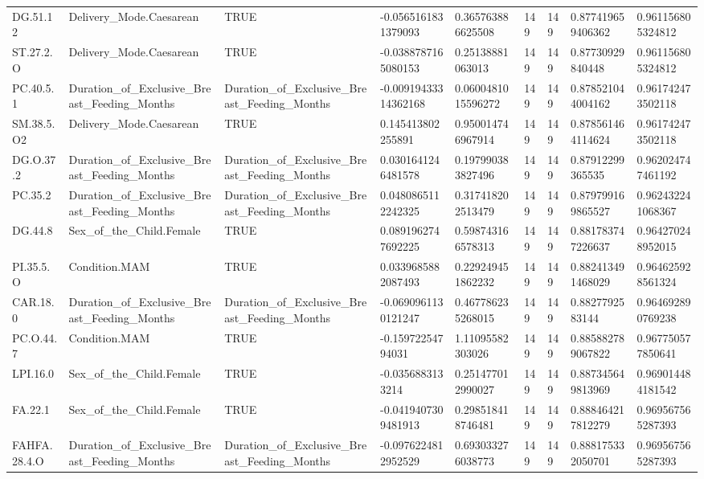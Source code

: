 \begin{longtable}{lllllllll}
DG.51.12 & Delivery\_Mode.Caesarean & TRUE & -0.0565161831379093 & 0.365763886625508 & 149 & 149 & 0.877419659406362 & 0.961156805324812 \\
ST.27.2.O & Delivery\_Mode.Caesarean & TRUE & -0.0388787165080153 & 0.25138881063013 & 149 & 149 & 0.87730929840448 & 0.961156805324812 \\
PC.40.5.1 & Duration\_of\_Exclusive\_Breast\_Feeding\_Months & Duration\_of\_Exclusive\_Breast\_Feeding\_Months & -0.00919433314362168 & 0.0600481015596272 & 149 & 149 & 0.878521044004162 & 0.961742473502118 \\
SM.38.5.O2 & Delivery\_Mode.Caesarean & TRUE & 0.145413802255891 & 0.950014746967914 & 149 & 149 & 0.878561464114624 & 0.961742473502118 \\
DG.O.37.2 & Duration\_of\_Exclusive\_Breast\_Feeding\_Months & Duration\_of\_Exclusive\_Breast\_Feeding\_Months & 0.0301641246481578 & 0.197990383827496 & 149 & 149 & 0.87912299365535 & 0.962024747461192 \\
PC.35.2 & Duration\_of\_Exclusive\_Breast\_Feeding\_Months & Duration\_of\_Exclusive\_Breast\_Feeding\_Months & 0.0480865112242325 & 0.317418202513479 & 149 & 149 & 0.879799169865527 & 0.962432241068367 \\
DG.44.8 & Sex\_of\_the\_Child.Female & TRUE & 0.0891962747692225 & 0.598743166578313 & 149 & 149 & 0.881783747226637 & 0.964270248952015 \\
PI.35.5.O & Condition.MAM & TRUE & 0.0339685882087493 & 0.229249451862232 & 149 & 149 & 0.882413491468029 & 0.964625928561324 \\
CAR.18.0 & Duration\_of\_Exclusive\_Breast\_Feeding\_Months & Duration\_of\_Exclusive\_Breast\_Feeding\_Months & -0.0690961130121247 & 0.467786235268015 & 149 & 149 & 0.8827792583144 & 0.964692890769238 \\
PC.O.44.7 & Condition.MAM & TRUE & -0.15972254794031 & 1.11095582303026 & 149 & 149 & 0.885882789067822 & 0.967750577850641 \\
LPI.16.0 & Sex\_of\_the\_Child.Female & TRUE & -0.0356883133214 & 0.251477012990027 & 149 & 149 & 0.887345649813969 & 0.969014484181542 \\
FA.22.1 & Sex\_of\_the\_Child.Female & TRUE & -0.0419407309481913 & 0.298518418746481 & 149 & 149 & 0.888464217812279 & 0.969567565287393 \\
FAHFA.28.4.O & Duration\_of\_Exclusive\_Breast\_Feeding\_Months & Duration\_of\_Exclusive\_Breast\_Feeding\_Months & -0.0976224812952529 & 0.693033276038773 & 149 & 149 & 0.888175332050701 & 0.969567565287393 \\

\end{longtable}
